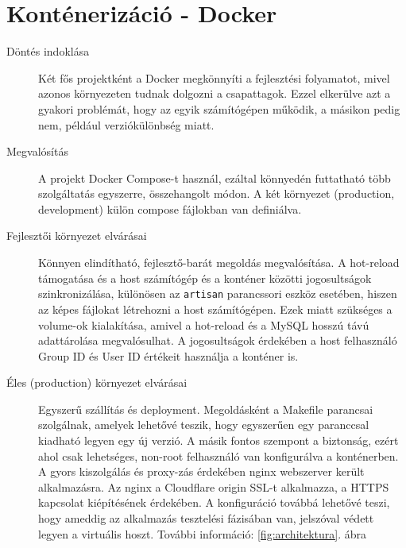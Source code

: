 \newpage

\section{Konténerizáció - Docker}
\label{sec:dockeconfig}
\begin{description}
    \item[Döntés indoklása]Két fős projektként a Docker megkönnyíti a fejlesztési  folyamatot, mivel azonos környezeten tudnak dolgozni a csapattagok. Ezzel elkerülve azt a gyakori problémát, hogy az egyik számítógépen működik, a másikon pedig nem, például verziókülönbség miatt.
    \item[Megvalósítás]A projekt Docker Compose-t használ, ezáltal könnyedén futtatható több szolgáltatás egyszerre, összehangolt módon. A két környezet (production, development) külön compose fájlokban van definiálva. 
    \item[Fejlesztői környezet elvárásai]Könnyen elindítható, fejlesztő-barát megoldás megvalósítása. A hot-reload támogatása és a host számítógép és a konténer közötti jogosultságok szinkronizálása, különösen az \texttt{artisan} parancssori eszköz esetében, hiszen az képes fájlokat létrehozni a host számítógépen. Ezek miatt szükséges a volume-ok kialakítása, amivel a hot-reload és a MySQL hosszú távú adattárolása megvalósulhat. A jogosultságok érdekében a host felhasználó Group ID és User ID értékeit használja a konténer is.
    \item[Éles (production) környezet elvárásai]Egyszerű szállítás és deployment. Megoldásként a Makefile parancsai szolgálnak, amelyek lehetővé teszik, hogy egyszerűen egy paranccsal kiadható legyen egy új verzió. A másik fontos szempont a biztonság, ezért ahol csak lehetséges, non-root felhasználó van konfigurálva a konténerben. A gyors kiszolgálás és proxy-zás érdekében nginx webszerver került alkalmazásra. Az nginx a Cloudflare origin SSL-t alkalmazza, a HTTPS kapcsolat kiépítésének érdekében. A konfiguráció továbbá lehetővé teszi, hogy ameddig az alkalmazás tesztelési fázisában van, jelszóval védett legyen a virtuális hoszt. További információ: \ref{fig:architektura}. ábra
    
\end{description}